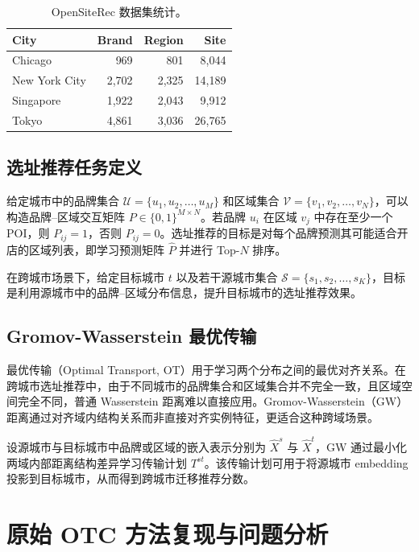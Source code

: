 \documentclass[10pt,twocolumn]{ctexart}
\begin{document}
\begin{table}[H]
\centering
\caption{OpenSiteRec 数据集统计。}
\label{tab:dataset_stats}
\begin{tabular}{lrrr}
\toprule
City & Brand & Region & Site \\
\midrule
Chicago & 969 & 801 & 8,044 \\
New York City & 2,702 & 2,325 & 14,189 \\
Singapore & 1,922 & 2,043 & 9,912 \\
Tokyo & 4,861 & 3,036 & 26,765 \\
\bottomrule
\end{tabular}
\end{table}

\subsection{选址推荐任务定义}

给定城市中的品牌集合 $\mathcal{U}=\{u_1,u_2,\ldots,u_M\}$ 和区域集合 $\mathcal{V}=\{v_1,v_2,\ldots,v_N\}$，可以构造品牌--区域交互矩阵 $P\in \{0,1\}^{M\times N}$。若品牌 $u_i$ 在区域 $v_j$ 中存在至少一个 POI，则 $P_{ij}=1$，否则 $P_{ij}=0$。选址推荐的目标是对每个品牌预测其可能适合开店的区域列表，即学习预测矩阵 $\hat{P}$ 并进行 Top-$N$ 排序。

在跨城市场景下，给定目标城市 $t$ 以及若干源城市集合 $\mathcal{S}=\{s_1,s_2,\ldots,s_K\}$，目标是利用源城市中的品牌--区域分布信息，提升目标城市的选址推荐效果。

\subsection{Gromov-Wasserstein 最优传输}

最优传输（Optimal Transport, OT）用于学习两个分布之间的最优对齐关系。在跨城市选址推荐中，由于不同城市的品牌集合和区域集合并不完全一致，且区域空间完全不同，普通 Wasserstein 距离难以直接应用。Gromov-Wasserstein（GW）距离通过对齐域内结构关系而非直接对齐实例特征，更适合这种跨域场景。

设源城市与目标城市中品牌或区域的嵌入表示分别为 $\hat{X}^{s}$ 与 $\hat{X}^{t}$，GW 通过最小化两域内部距离结构差异学习传输计划 $T^{st}$。该传输计划可用于将源城市 embedding 投影到目标城市，从而得到跨城市迁移推荐分数。

\section{原始 OTC 方法复现与问题分析}
\end{document}
